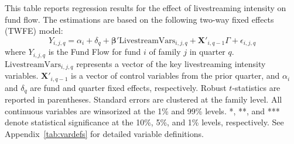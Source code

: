 \begin{table}[!ht]
    \centering
    
    \caption{The Effect of Livestream Intensity on Fund Flows}\label{tab:fund_livestream_count_twfe}
    
    \begin{minipage}{0.95\textwidth}
        \footnotesize
        This table reports regression results for the effect of livestreaming intensity on fund flow. The estimations are based on the following two-way fixed effects (TWFE) model:
        \begin{equation*}
            Y_{i,j,q} = \alpha_i + \delta_q + \boldsymbol{\beta}' \text{LivestreamVars}_{i,j,q} + \mathbf{X}'_{i,q-1} \Gamma + \epsilon_{i,j,q}
        \end{equation*}
        where $Y_{i,j,q}$ is the Fund Flow for fund $i$ of family $j$ in quarter $q$. $\text{LivestreamVars}_{i,j,q}$ represents a vector of the key livestreaming intensity variables. $\mathbf{X}'_{i,q-1}$ is a vector of control variables from the prior quarter, and $\alpha_i$ and $\delta_q$ are fund and quarter fixed effects, respectively. Robust $t$-statistics are reported in parentheses. Standard errors are clustered at the family level. All continuous variables are winsorized at the 1\% and 99\% levels. *, **, and *** denote statistical significance at the 10\%, 5\%, and 1\% levels, respectively. See Appendix~\ref{tab:vardefs} for detailed variable definitions.
    \end{minipage}

    \vspace{2mm}

    { 
    \footnotesize %
     
    }

\end{table}